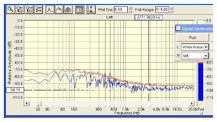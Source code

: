 			\begin{figure}
				\centering
				\includegraphics[scale=0.3]{./Figuras/ruido_balnco.jpg}
			\end{figure}
%		
%
%
